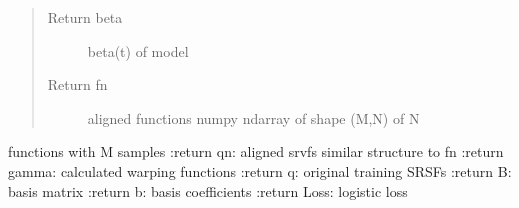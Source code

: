 \documentclass[letterpaper,10pt,english]{sphinxmanual}
\begin{document}
\begin{fulllineitems}
\begin{quote}
\begin{description}
\item[{Return beta}] \leavevmode
beta(t) of model

\item[{Return fn}] \leavevmode
aligned functions \sphinxhyphen{} numpy ndarray of shape (M,N) of N

\end{description}\end{quote}

functions with M samples
:return qn: aligned srvfs \sphinxhyphen{} similar structure to fn
:return gamma: calculated warping functions
:return q: original training SRSFs
:return B: basis matrix
:return b: basis coefficients
:return Loss: logistic loss

\end{fulllineitems}

\end{document}
